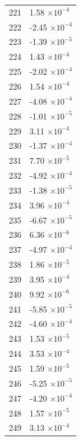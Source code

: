 \documentclass[a4paper,11pt]{article}
\begin{document}
\begin{center}
\begin{longtable}{|R{1.5cm}|R{2.5cm}|}
  221 &         1.58 $\times 10^{          -4}$ \\
  222 &        -2.45 $\times 10^{          -4}$ \\
  223 &        -1.39 $\times 10^{          -5}$ \\
  224 &         1.43 $\times 10^{          -4}$ \\
  225 &        -2.02 $\times 10^{          -4}$ \\
  226 &         1.54 $\times 10^{          -4}$ \\
  227 &        -4.08 $\times 10^{          -4}$ \\
  228 &        -1.01 $\times 10^{          -5}$ \\
  229 &         3.11 $\times 10^{          -4}$ \\
  230 &        -1.37 $\times 10^{          -4}$ \\
  231 &         7.70 $\times 10^{          -5}$ \\
  232 &        -4.92 $\times 10^{          -4}$ \\
  233 &        -1.38 $\times 10^{          -5}$ \\
  234 &         3.96 $\times 10^{          -4}$ \\
  235 &        -6.67 $\times 10^{          -5}$ \\
  236 &         6.36 $\times 10^{          -6}$ \\
  237 &        -4.97 $\times 10^{          -4}$ \\
  238 &         1.86 $\times 10^{          -5}$ \\
  239 &         3.95 $\times 10^{          -4}$ \\
  240 &         9.92 $\times 10^{          -6}$ \\
  241 &        -5.85 $\times 10^{          -5}$ \\
  242 &        -4.60 $\times 10^{          -4}$ \\
  243 &         1.53 $\times 10^{          -5}$ \\
  244 &         3.53 $\times 10^{          -4}$ \\
  245 &         1.59 $\times 10^{          -5}$ \\
  246 &        -5.25 $\times 10^{          -5}$ \\
  247 &        -4.20 $\times 10^{          -4}$ \\
  248 &         1.57 $\times 10^{          -5}$ \\
  249 &         3.13 $\times 10^{          -4}$ \\

\end{longtable}
\end{center}
\end{document}
